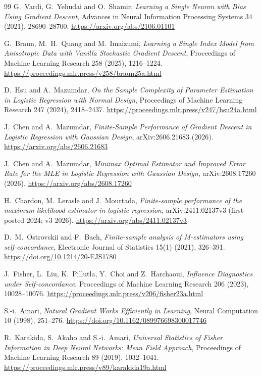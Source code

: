 \documentclass[11pt]{article}
\begin{document}
\begin{thebibliography}{99}
G.~Vardi, G.~Yehudai and O.~Shamir,
\emph{Learning a Single Neuron with Bias Using Gradient Descent},
Advances in Neural Information Processing Systems 34 (2021), 28690--28700.
\url{https://arxiv.org/abs/2106.01101}

G.~Braun, M.~H.~Quang and M.~Imaizumi,
\emph{Learning a Single Index Model from Anisotropic Data with Vanilla Stochastic Gradient Descent},
Proceedings of Machine Learning Research 258 (2025), 1216--1224.
\url{https://proceedings.mlr.press/v258/braun25a.html}

D.~Hsu and A.~Mazumdar,
\emph{On the Sample Complexity of Parameter Estimation in Logistic Regression with Normal Design},
Proceedings of Machine Learning Research 247 (2024), 2418--2437.
\url{https://proceedings.mlr.press/v247/hsu24a.html}

J.~Chen and A.~Mazumdar,
\emph{Finite-Sample Performance of Gradient Descent in Logistic Regression with Gaussian Design},
arXiv:2606.21683 (2026).
\url{https://arxiv.org/abs/2606.21683}

J.~Chen and A.~Mazumdar,
\emph{Minimax Optimal Estimator and Improved Error Rate for the MLE in Logistic Regression with Gaussian Design},
arXiv:2608.17260 (2026).
\url{https://arxiv.org/abs/2608.17260}

H.~Chardon, M.~Lerasle and J.~Mourtada,
\emph{Finite-sample performance of the maximum likelihood estimator in logistic regression},
arXiv:2411.02137v3 (first posted 2024; v3 2026).
\url{https://arxiv.org/abs/2411.02137v3}

D.~M.~Ostrovskii and F.~Bach,
\emph{Finite-sample analysis of M-estimators using self-concordance},
Electronic Journal of Statistics 15(1) (2021), 326--391.
\url{https://doi.org/10.1214/20-EJS1780}

J.~Fisher, L.~Liu, K.~Pillutla, Y.~Choi and Z.~Harchaoui,
\emph{Influence Diagnostics under Self-concordance},
Proceedings of Machine Learning Research 206 (2023), 10028--10076.
\url{https://proceedings.mlr.press/v206/fisher23a.html}

S.-i.~Amari,
\emph{Natural Gradient Works Efficiently in Learning},
Neural Computation 10 (1998), 251--276.
\url{https://doi.org/10.1162/089976698300017746}

R.~Karakida, S.~Akaho and S.-i.~Amari,
\emph{Universal Statistics of Fisher Information in Deep Neural Networks: Mean Field Approach},
Proceedings of Machine Learning Research 89 (2019), 1032--1041.
\url{https://proceedings.mlr.press/v89/karakida19a.html}


\end{thebibliography}
\end{document}

